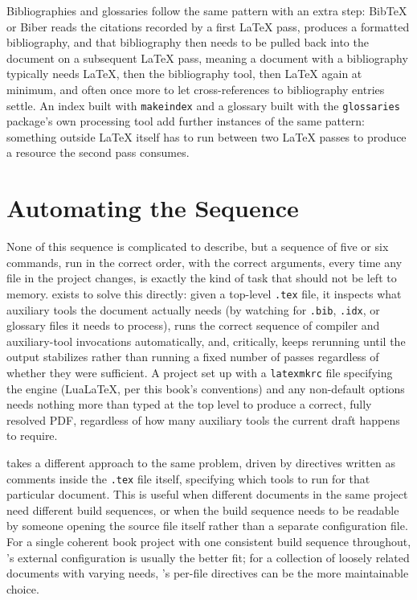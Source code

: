 Bibliographies and glossaries follow the same pattern with an extra step: BibTeX or Biber reads the citations recorded by a first LaTeX pass, produces a formatted bibliography, and that bibliography then needs to be pulled back into the document on a subsequent LaTeX pass, meaning a document with a bibliography typically needs LaTeX, then the bibliography tool, then LaTeX again at minimum, and often once more to let cross-references to bibliography entries settle. An index built with \texttt{makeindex} and a glossary built with the \texttt{glossaries} package's own processing tool add further instances of the same pattern: something outside LaTeX itself has to run between two LaTeX passes to produce a resource the second pass consumes.

\hypertarget{automating-the-sequence}{%
\section{Automating the Sequence}\label{automating-the-sequence}}

None of this sequence is complicated to describe, but a sequence of five or six commands, run in the correct order, with the correct arguments, every time any file in the project changes, is exactly the kind of task that should not be left to memory.  exists to solve this directly: given a top-level \texttt{.tex} file, it inspects what auxiliary tools the document actually needs (by watching for \texttt{.bib}, \texttt{.idx}, or glossary files it needs to process), runs the correct sequence of compiler and auxiliary-tool invocations automatically, and, critically, keeps rerunning until the output stabilizes rather than running a fixed number of passes regardless of whether they were sufficient. A project set up with a \texttt{latexmkrc} file specifying the engine (LuaLaTeX, per this book's conventions) and any non-default options needs nothing more than  typed at the top level to produce a correct, fully resolved PDF, regardless of how many auxiliary tools the current draft happens to require.

 takes a different approach to the same problem, driven by directives written as comments inside the \texttt{.tex} file itself, specifying which tools to run for that particular document. This is useful when different documents in the same project need different build sequences, or when the build sequence needs to be readable by someone opening the source file itself rather than a separate configuration file. For a single coherent book project with one consistent build sequence throughout, 's external configuration is usually the better fit; for a collection of loosely related documents with varying needs, 's per-file directives can be the more maintainable choice.

